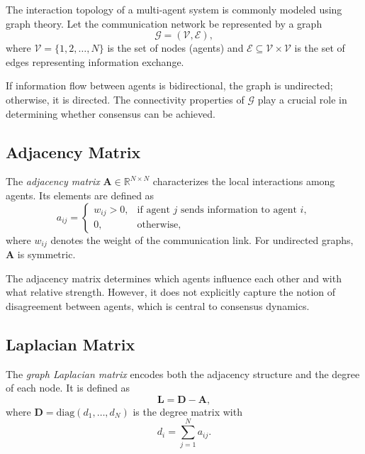 The interaction topology of a multi-agent system is commonly modeled using graph theory.
Let the communication network be represented by a graph
\begin{equation}
    \mathcal{G} = (\mathcal{V}, \mathcal{E}),
\end{equation}
where $\mathcal{V} = \{1,2,\dots,N\}$ is the set of nodes (agents) and $\mathcal{E} \subseteq \mathcal{V} \times \mathcal{V}$ is the set of edges representing information exchange.

If information flow between agents is bidirectional, the graph is undirected; otherwise, it is directed.
The connectivity properties of $\mathcal{G}$ play a crucial role in determining whether consensus can be achieved.

\subsection{Adjacency Matrix}

The \textit{adjacency matrix} $\mathbf{A} \in \mathbb{R}^{N \times N}$ characterizes the local interactions among agents.
Its elements are defined as
\begin{equation}
    a_{ij} =
    \begin{cases}
        w_{ij} > 0, & \text{if agent $j$ sends information to agent $i$}, \\
        0, & \text{otherwise},
    \end{cases}
\end{equation}
where $w_{ij}$ denotes the weight of the communication link.
For undirected graphs, $\mathbf{A}$ is symmetric.

The adjacency matrix determines which agents influence each other and with what relative strength.
However, it does not explicitly capture the notion of disagreement between agents, which is central to consensus dynamics.

\subsection{Laplacian Matrix}

The \textit{graph Laplacian matrix} encodes both the adjacency structure and the degree of each node.
It is defined as
\begin{equation}
    \mathbf{L} = \mathbf{D} - \mathbf{A},
\end{equation}
where $\mathbf{D} = \text{diag}(d_1, \dots, d_N)$ is the degree matrix with
\begin{equation}
    d_i = \sum_{j=1}^{N} a_{ij}.
\end{equation}

